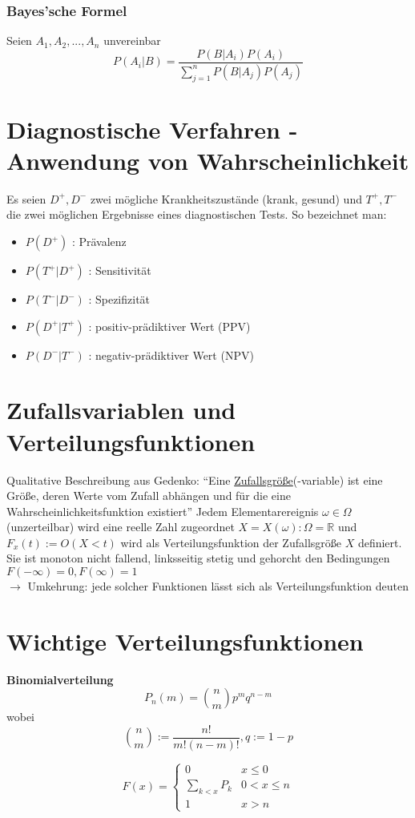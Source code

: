 \subsubsection{Bayes'sche Formel} 
Seien $A_1,A_2,...,A_n$ unvereinbar 
\[ P(A_i|B)=\frac{P(B|A_i) P(A_i)}{\sum\limits_{j=1}^n P(B|A_j) P(A_j)} \]

\section{Diagnostische Verfahren - Anwendung von Wahrscheinlichkeit}
Es seien $D^+, D^-$ zwei mögliche Krankheitszustände (krank, gesund) und $T^+,T^-$ die zwei möglichen Ergebnisse eines diagnostischen Tests.
So bezeichnet man:
\begin{itemize}
 \item $P(D^+)$ : Prävalenz
 \item $P(T^+|D^+)$ : Sensitivität
 \item $P(T^-|D^-)$ : Spezifizität
 \item $P(D^+|T^+)$ : positiv-prädiktiver Wert (PPV)
 \item $P(D^-|T^-)$ : negativ-prädiktiver Wert (NPV)
\end{itemize}

\section{Zufallsvariablen und Verteilungsfunktionen}
Qualitative Beschreibung aus Gedenko: ``Eine \underline{Zufallsgröße}(-variable) ist eine Größe, deren Werte vom Zufall abhängen und für die eine Wahrscheinlichkeitsfunktion existiert''
Jedem Elementarereignis $\omega \in \Omega$ (unzerteilbar) wird eine reelle Zahl zugeordnet $X=X(\omega) : \Omega = \mathbb{R}$ und $F_x(t):=O(X<t)$ wird als Verteilungsfunktion der Zufallsgröße $X$ definiert. Sie ist monoton nicht fallend, linksseitig stetig und gehorcht den Bedingungen $F(-\infty)=0,F(\infty)=1$ \\
$\rightarrow$ Umkehrung: jede solcher Funktionen lässt sich als Verteilungsfunktion deuten

\section{Wichtige Verteilungsfunktionen}
\textbf{Binomialverteilung}
\[ P_n(m)=\binom{n}{m}p^m q^{n-m} \] 
wobei \[ \binom{n}{m}:=\frac{n!}{m!(n-m)!}, q:= 1-p \] 

\[ F(x)=
  \begin{cases}
    0 & x \leq 0 \\
    \sum\limits_{k<x}P_k & 0 < x \leq n \\
    1 & x > n
  \end{cases}
\] 

